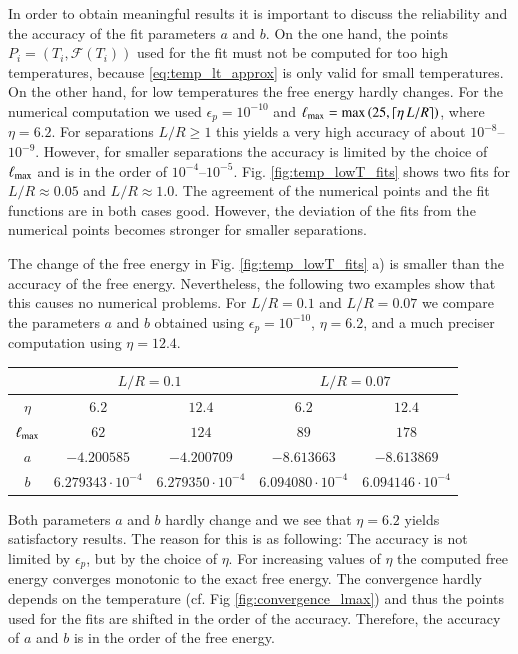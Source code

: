 In order to obtain meaningful results it is important to discuss the
reliability and the accuracy of the fit parameters $a$ and $b$. On the one
hand, the points $P_i=(T_i,\mathcal{F}(T_i))$ used for the fit must not be
computed for too high temperatures, because \eqref{eq:temp_lt_approx} is only
valid for small temperatures. On the other hand, for low temperatures the free
energy hardly changes. For the numerical computation we used
$\epsilon_p=10^{-10}$ and ${\ell_\text{max}}=\max\left(25, \lceil \eta \, L/R
\rceil\right)$, where $\eta = 6.2$. For separations $L/R \ge 1$ this yields a
very high accuracy of about $10^{-8}$--$10^{-9}$. However, for smaller
separations the accuracy is limited by the choice of ${\ell_\text{max}}$ and is in the
order of $10^{-4}$--$10^{-5}$. Fig. \ref{fig:temp_lowT_fits} shows two fits
for $L/R\approx0.05$ and $L/R\approx1.0$. The agreement of the numerical
points and the fit functions are in both cases good. However, the deviation of
the fits from the numerical points becomes stronger for smaller separations.

The change of the free energy in Fig. \ref{fig:temp_lowT_fits} a) is smaller
than the accuracy of the free energy. Nevertheless, the following two examples
show that this causes no numerical problems. For $L/R=0.1$ and $L/R=0.07$ we
compare the parameters $a$ and $b$ obtained using $\epsilon_p = 10^{-10}$,
$\eta=6.2$, and a much preciser computation using $\eta=12.4$.
\begin{center}
\begin{tabular}{|c|c|c|c|c|}
\hline
        & \multicolumn{2}{c|}{$L/R=0.1$} & \multicolumn{2}{c|}{$L/R=0.07$} \\
\hline
$\eta$  & $6.2$       & $12.4$ & $6.2$ & $12.4$ \\
\hline
${\ell_\text{max}}$ & $62$        & $124$  & $89$  & $178$ \\
\hline
$a$     & $-4.200585$ & $-4.200709$    & $-8.613663$ & $-8.613869$ \\
\hline
$b$     & $6.279343\cdot10^{-4}$ & $6.279350\cdot10^{-4}$ & $6.094080\cdot10^{-4}$ & $6.094146\cdot10^{-4}$ \\
\hline
\end{tabular}
\end{center}
Both parameters $a$ and $b$ hardly change and we see that $\eta=6.2$ yields
satisfactory results. The reason for this is as following: The accuracy is not limited
by $\epsilon_p$, but by the choice of $\eta$. For increasing values of $\eta$ the computed free energy
converges monotonic to the exact free energy. The convergence hardly depends on
the temperature (cf. Fig \ref{fig:convergence_lmax}) and thus the points used for the fits are shifted in the order of the
accuracy. Therefore, the accuracy of $a$ and $b$ is in the order of the free energy.

